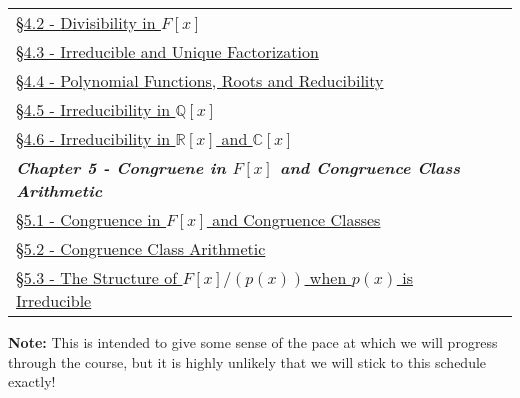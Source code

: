 \documentclass{article}
\newcommand{\chaptercolor}{RoyalBlue!35}
\begin{document}
\begin{center}
\begin{tabular}{|l|l|l|l|l|}
\href{}{\S4.2 - Divisibility in $F[x]$} & & & \\
\href{}{\S4.3 - Irreducible and Unique Factorization} & & & \\
\href{}{\S4.4 - Polynomial Functions, Roots and Reducibility} & & & \\
\href{}{\S4.5 - Irreducibility in $\mathbb{Q}[x]$} & & & \\
\href{}{\S4.6 - Irreducibility in $\mathbb{R}[x]$ and $\mathbb{C}[x]$} & & & \\
\hline
\multicolumn{4}{|l|}{\cellcolor{\chaptercolor} \textit{\textbf{Chapter 5 - Congruene in $F[x]$ and Congruence Class Arithmetic}}}\\
\hline
\href{}{\S5.1 - Congruence in $F[x]$ and Congruence Classes} & & & \\
\href{}{\S5.2 - Congruence Class Arithmetic} & & & \\
\href{}{\S5.3 - The Structure of $F[x]/(p(x))$ when $p(x)$ is Irreducible} & & & \\
\hline
\end{tabular}
\end{center}
\noindent \textbf{Note:} This is intended to give some sense of the pace at which we will progress through the course, but it is highly unlikely that we will stick to this schedule exactly!
\end{document}

